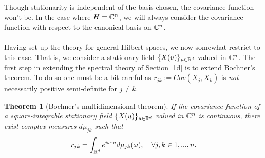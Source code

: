 \documentclass[12pt]{article}
\newtheorem{theorem}{Theorem}
\begin{document}
Though stationarity is independent of the basis chosen, the covariance function won't be. In the case where  $H=\mathbb{C}^n$, we will always consider the covariance function with respect to the canonical basis on $\mathbb{C}^n$.
\\
\\
Having set up the theory for general Hilbert spaces, we now somewhat restrict to this case. That is, we consider a stationary field $\{X(u)\}_{u\in{\mathbb R}^d}$ valued in $\mathbb{C}^n$. The first step in extending the spectral theory of Section \ref{1d} is to extend Bochner's theorem. To do so one must be a bit careful as $r_{ j k }:=Cov(X_j,X_k)$ is \emph{not} necessarily positive semi-definite for $j\neq k$.
\begin{theorem}[Bochner's multidimensional theorem]\label{bochner 3d}
    If the covariance function of a square-integrable stationary field $\{X(u)\}_{u\in{\mathbb R}^d}$ valued in $\mathbb{C}^n$ is continuous, there exist complex measures $d\mu_{jk}$ such that
    \begin{equation*}
        r_{jk}=\int_{{\mathbb R}^d} e^{i\omega \cdot u} d\mu _{j k}(\omega),\quad \forall j,k\in{1,...,n}.
    \end{equation*}
\end{theorem}
\end{document}
